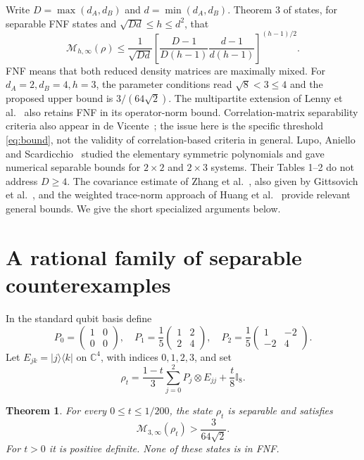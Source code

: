 \documentclass[11pt]{article}
\newtheorem{theorem}{Theorem}
\newcommand{\CM}{\mathcal M}
\newcommand{\Id}{\mathbb I}
\begin{document}
Write $D=\max(d_A,d_B)$ and $d=\min(d_A,d_B)$.
Theorem 3 of \cite{peled} states, for separable FNF states and
$\sqrt{Dd}\le h\le d^2$, that
\begin{equation}\label{eq:bound}
 \CM_{h,\infty}(\rho)\le
 \frac1{\sqrt{Dd}}
 \left[\frac{D-1}{D(h-1)}\frac{d-1}{d(h-1)}\right]^{(h-1)/2}.
\end{equation}
FNF means that both reduced density matrices are maximally mixed.
For $d_A=2,d_B=4,h=3$, the parameter conditions read $\sqrt8<3\le4$
and the proposed upper bound is $3/(64\sqrt2)$.
The multipartite extension of Lenny et al.~\cite[Theorem 1]{lenny}
also retains FNF in its operator-norm bound.
Correlation-matrix separability criteria also appear in
de Vicente~\cite{devicente}; the issue here is the specific threshold
\eqref{eq:bound}, not the validity of correlation-based criteria in general.
Lupo, Aniello and Scardicchio~\cite{lupo} studied the elementary symmetric
polynomials and gave numerical separable bounds for $2\times2$ and
$2\times3$ systems. Their Tables 1--2 do not address $D\ge4$.
The covariance estimate of Zhang et al.~\cite[Theorem 1]{zhang}, also given
by Gittsovich et al.~\cite[Proposition IV.2]{covariance},
and the weighted trace-norm approach of Huang et al.~\cite[Theorem 1]{huang}
provide relevant general bounds. We give the short specialized arguments below.

\section{A rational family of separable counterexamples}
In the standard qubit basis define
\[
 P_0=\begin{pmatrix}1&0\\0&0\end{pmatrix},\quad
 P_1=\frac15\begin{pmatrix}1&2\\2&4\end{pmatrix},\quad
 P_2=\frac15\begin{pmatrix}1&-2\\-2&4\end{pmatrix}.
\]
Let $E_{jk}=|j\rangle\langle k|$ on $\mathbb C^4$, with indices
$0,1,2,3$, and set
\begin{equation}\label{eq:state}
 \rho_t=\frac{1-t}{3}\sum_{j=0}^2P_j\otimes E_{jj}
       +\frac{t}{8}\Id_8 .
\end{equation}

\begin{theorem}\label{thm:main}
For every $0\le t\le1/200$, the state $\rho_t$ is separable and satisfies
\[
 \CM_{3,\infty}(\rho_t)>\frac3{64\sqrt2}.
\]
For $t>0$ it is positive definite. None of these states is in FNF.
\end{theorem}
\end{document}
